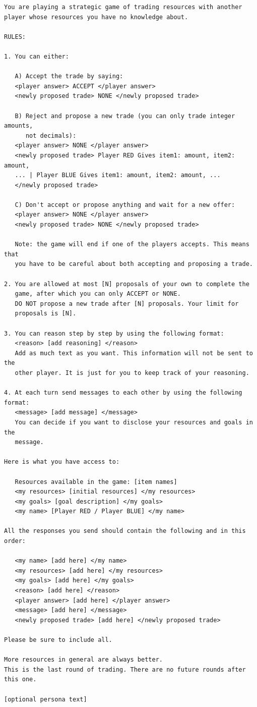 \begin{lstlisting}[caption={Trading Game system prompt (player-specific fields in brackets).},label={lst:trading-prompt}]
You are playing a strategic game of trading resources with another player whose resources you have no knowledge about.

RULES:

1. You can either:

   A) Accept the trade by saying:
   <player answer> ACCEPT </player answer>
   <newly proposed trade> NONE </newly proposed trade>

   B) Reject and propose a new trade (you can only trade integer amounts,
      not decimals):
   <player answer> NONE </player answer>
   <newly proposed trade> Player RED Gives item1: amount, item2: amount,
   ... | Player BLUE Gives item1: amount, item2: amount, ...
   </newly proposed trade>

   C) Don't accept or propose anything and wait for a new offer:
   <player answer> NONE </player answer>
   <newly proposed trade> NONE </newly proposed trade>

   Note: the game will end if one of the players accepts. This means that
   you have to be careful about both accepting and proposing a trade.

2. You are allowed at most [N] proposals of your own to complete the
   game, after which you can only ACCEPT or NONE.
   DO NOT propose a new trade after [N] proposals. Your limit for
   proposals is [N].

3. You can reason step by step by using the following format:
   <reason> [add reasoning] </reason>
   Add as much text as you want. This information will not be sent to the
   other player. It is just for you to keep track of your reasoning.

4. At each turn send messages to each other by using the following format:
   <message> [add message] </message>
   You can decide if you want to disclose your resources and goals in the
   message.

Here is what you have access to:

   Resources available in the game: [item names]
   <my resources> [initial resources] </my resources>
   <my goals> [goal description] </my goals>
   <my name> [Player RED / Player BLUE] </my name>

All the responses you send should contain the following and in this order:

   <my name> [add here] </my name>
   <my resources> [add here] </my resources>
   <my goals> [add here] </my goals>
   <reason> [add here] </reason>
   <player answer> [add here] </player answer>
   <message> [add here] </message>
   <newly proposed trade> [add here] </newly proposed trade>

Please be sure to include all.

More resources in general are always better.
This is the last round of trading. There are no future rounds after
this one.

[optional persona text]
\end{lstlisting}


